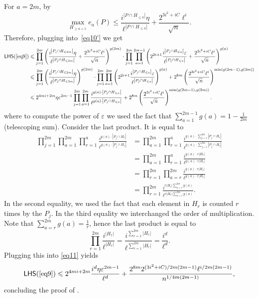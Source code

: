 \documentclass{toc}
\newcommand\card[1]{\left| {#1} \right|}
\newcommand\eps{\varepsilon}
\renewcommand\geq{\geqslant}
\renewcommand\leq{\leqslant}
\begin{document}
For $a=2m$, by 
\[
\max_{H_{\geq a+1}} e_a(P)
\leq \frac{i^{\card{P\cap H_{\leq a}}} \eta}{\ell^{\card{P\cap H_{\leq a}}}} + \frac{2^{3i^2+iC} \ell^{i}}{\sqrt{n}}.
\]
Therefore, plugging into~\eqref{eq10'} we get
\begin{align}\label{eq11}
{\sf LHS}(\ref{eq9})
&\leq
\prod\limits_{j=1}^{2m}{
\left(\frac{i^{\card{P_j\cap H_{\leq 2m}}} \eta}{\ell^{\card{P_j\cap H_{\leq 2m}}}} + \frac{2^{3i^2+iC} \ell^{i}}{\sqrt{n}}\right)^{g(2m)}}
\cdot \prod\limits_{j=1}^{2m}{\prod\limits_{a=1}^{2m-1}{
\left(2^{2i+1} \frac{i^{\card{P_j\cap H_{\leq a}}} \eps}{\ell^{\card{P_j\cap H_{\leq a}}}} + \frac{2^{3i^2+iC} \ell^{i}}{\sqrt{n}}\right)^{g(a)}}}\nonumber\\
&\leq
\prod\limits_{j=1}^{2m}{
\left(\frac{i^{\card{P_j\cap H_{\leq 2m}}} \eta}{\ell^{\card{P_j\cap H_{\leq 2m}}}}\right)^{g(2m)}}
\cdot\prod\limits_{j=1}^{2m}{\prod\limits_{a=1}^{2m}{
\left(2^{2i+1}\frac{i^{\card{P_j\cap H_{\leq a}}} \eps}{\ell^{\card{P_j\cap H_{\leq a}}}}\right) ^{g(a)}}}
+2^{8m} \left(\frac{2^{3i^2+iC} \ell^{i}}{\sqrt{n}}\right)^{\min(g(2m-1),g(2m))}\nonumber\\
&\leq 2^{4mi+2m}\eta\eps^{2m-1}\prod\limits_{j=1}^{2m}{\prod\limits_{a=1}^{2m}{
\frac{i^{g(a)\cdot \card{P_j\cap H_{\leq a}}}}{\ell^{g(a)\cdot \card{P_j\cap H_{\leq a}}}}}}
+2^{8m} \left(\frac{2^{3i^2+iC} \ell^{i}}{\sqrt{n}}\right)^{\min(g(2m-1),g(2m))}.
\end{align}
where to compute the power of $\eps$ we used the fact that $\sum\limits_{a=1}^{2m-1}{g(a)} = 1-\frac{1}{2m}$ %
(telescoping sum).  %
Consider the last product. It is equal to
\begin{align*}
\prod\limits_{j=1}^{2m}{
\prod\limits_{a=1}^{2m}{
\prod\limits_{r=1}^{a}
\frac{i^{g(a)\cdot \card{P_j\cap H_{r}}}}{\ell^{g(a)\cdot \card{P_j\cap H_{r}}}}}}
&=
\prod\limits_{a=1}^{2m}{
\prod\limits_{r=1}^{a}
\frac{i^{g(a)\cdot \sum\limits_{j=1}^{2m}{\card{P_j\cap H_{r}}}}}{\ell^{g(a)\cdot \sum\limits_{j=1}^{2m}{\card{P_j\cap H_{r}}}}}}\\
&= \prod\limits_{a=1}^{2m}{
\prod\limits_{r=1}^{a}
\frac{i^{g(a)\cdot r\card{H_r}}}{\ell^{g(a)\cdot r\card{H_r}}}}\\
&=
\prod\limits_{r=1}^{2m}{
\prod\limits_{a=r}^{2m}
\frac{i^{g(a)\cdot r\card{H_r}}}{\ell^{g(a)\cdot r\card{H_r}}}}\\
&=
\prod\limits_{r=1}^{2m}{
\frac{i^{r\card{H_r}\sum\limits_{a=r}^{2m}{g(a)}}}{\ell^{r\card{H_r}\sum\limits_{a=r}^{2m}{g(a)}}}}.
\end{align*}
In the second equality, we used the fact that each element in $H_r$ is counted $r$ times
by the %
$P_j$.   %
In the third equality we interchanged the
order of multiplication. Note that $\sum\limits_{a=r}^{2m}{g(a)} = \frac{1}{r}$, hence the last product is equal to
\[
\prod\limits_{r=1}^{2m}{
\frac{i^{\card{H_r}}}{\ell^{\card{H_r}}}}
=\frac{i^{\sum\limits_{r=1}^{2m}{\card{H_r}}}}{\ell^{\sum\limits_{r=1}^{2m}{\card{H_r}}}}
=\frac{i^d}{\ell^{d}}.
\]
Plugging this into \eqref{eq11} yields
\[
{\sf LHS}(\ref{eq9})\leq
2^{4mi+2m}\frac{i^{d}\eta\eps^{2m-1}}{\ell^{d}}
+\frac{2^{8m}2^{(3i^2+iC)/2m(2m-1)} \ell^{i/2m(2m-1)}}{n^{1/4m(2m-1)}},
\]
concluding the proof of .  %
%
%
%
\end{document}
